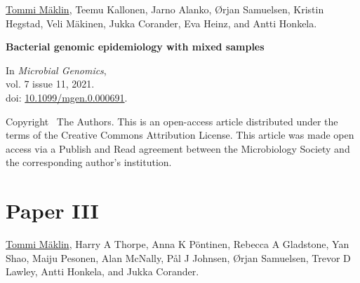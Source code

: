 \vspace{80pt}

\underline{Tommi Mäklin}, Teemu Kallonen, Jarno Alanko, Ørjan
Samuelsen, Kristin Hegstad, Veli Mäkinen, Jukka Corander, Eva Heinz,
and Antti Honkela.

\vspace{10pt}
\noindent\textbf{Bacterial genomic epidemiology with mixed samples}

\vspace{10pt}
\noindent In 
\emph{Microbial Genomics}, 
\\vol. 7 issue 11, 2021.
\\doi: \href{https://doi.org/10.1099/mgen.0.000691}{10.1099/mgen.0.000691}.

\vspace{60pt}
\noindent Copyright \textcopyright\ The Authors. This is an
open-access article distributed under the terms of the Creative
Commons Attribution License. This article was made open access via a
Publish and Read agreement between the Microbiology Society and the
corresponding author’s institution.

\cleardoublepage




\chapter*{Paper III}\thispagestyle{plain}







\vspace{80pt}
\underline{Tommi Mäklin}, Harry A Thorpe, Anna K Pöntinen, Rebecca
A Gladstone, Yan Shao, Maiju Pesonen, Alan McNally, Pål J Johnsen,
Ørjan Samuelsen, Trevor D Lawley, Antti Honkela, and Jukka
Corander.

